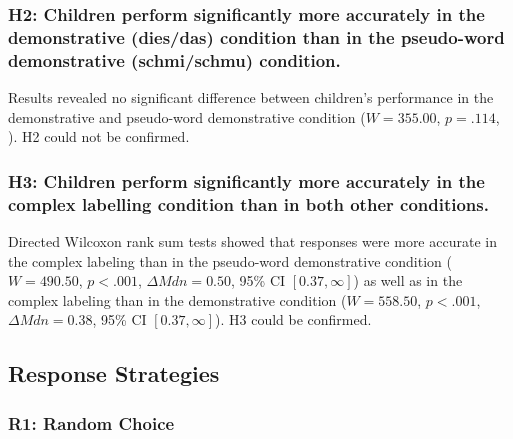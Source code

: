 \documentclass[
  man,floatsintext]{apa6}
\begin{document}
\subsubsection{H2: Children perform significantly more accurately in the demonstrative (dies/das) condition than in the pseudo-word demonstrative (schmi/schmu) condition.}\label{h2-children-perform-significantly-more-accurately-in-the-demonstrative-diesdas-condition-than-in-the-pseudo-word-demonstrative-schmischmu-condition.}

Results revealed no significant difference between children's
performance in the demonstrative and pseudo-word demonstrative condition
(\(W = 355.00\), \(p = .114\), ). H2 could not be confirmed.

\subsubsection{H3: Children perform significantly more accurately in the complex labelling condition than in both other conditions.}\label{h3-children-perform-significantly-more-accurately-in-the-complex-labelling-condition-than-in-both-other-conditions.}

Directed Wilcoxon rank sum tests showed that responses were more accurate in the complex labeling than in the pseudo-word demonstrative condition (\(W = 490.50\), \(p < .001\), \(\Delta \mathit{Mdn} = 0.50\), 95\% CI \([0.37, \infty]\)) as well as in the complex labeling than in the demonstrative condition (\(W = 558.50\), \(p < .001\), \(\Delta \mathit{Mdn} = 0.38\), 95\% CI \([0.37, \infty]\)). H3 could be confirmed.

\subsection{Response Strategies}\label{response-strategies}

\subsubsection{R1: Random Choice}\label{r1-random-choice}
\end{document}
